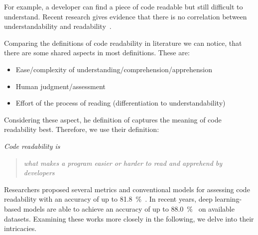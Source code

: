 \documentclass[%
class=scrreprt,
chapterprefix=false,%
open=right,%
twoside=false,%
paper=a4,%
logofile={Logo\_zentral\_farbig\_EN.png},%
thesistype=master,%
UKenglish,%
]{se2thesis}
\theoremstyle{definition}
\newtheorem{definition}{Definition}[section]
\newcommand{\citeclassicmodels}{\cite{buse2009learning, posnett2011simpler, dorn2012general, scalabrino2018comprehensive}\xspace}
\newcommand{\citedeepmodels}{\cite{mi2018inception, mi2018improving, sharma2020egan, mi2022towards, mi2022rank, mi2023graph}\xspace}
\begin{document}
	For example, a developer can find a piece of code readable but still difficult to understand. Recent research gives evidence that there is no correlation between understandability and readability~\cite{scalabrino2017automatically}.	
	
	
		

	Comparing the definitions of code readability in literature we can notice, that there are some shared aspects in most definitions. These are:
	\begin{itemize}
		\item Ease/complexity of understanding/comprehension/apprehension
		\item Human judgment/assessment
		\item Effort of the process of reading (differentiation to understandability)
	\end{itemize}
	
	Considering these aspect, he definition of \citeauthor{oliveira2020evaluating} captures the meaning of code readability best. Therefore, we use their definition:
	
	\textit{Code readability is} \blockcquote{oliveira2020evaluating}{\textit{what makes a program easier or harder to read and apprehend by developers}}.
	

	Researchers proposed several metrics and conventional models for assessing code readability with an accuracy of up to 81.8~\%~\citeclassicmodels. In recent years, deep learning-based models are able to achieve an accuracy of up to 88.0~\%~\citedeepmodels on available datasets. 
	Examining these works more closely in the following, we delve into their intricacies.
	
\end{document}
